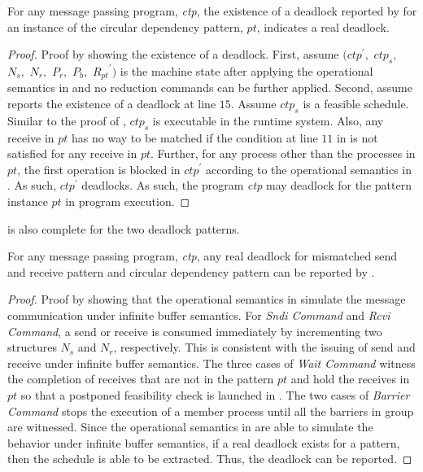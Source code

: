 \begin{lemma}
For any message passing program, \textit{ctp}, the existence of a deadlock reported by  for an instance of the circular dependency pattern, $\mathit{pt}$, indicates a real deadlock. 
\label{lemma:circular}
\end{lemma}
\begin{proof}
Proof by showing the existence of a deadlock. First, assume $(\mathit{ctp}^\prime,$ $\mathit{ctp}_s,$ $\mathit{N_s},$ $\mathit{N_r},$ $\mathit{P_r},$ $\mathit{P_b},$ $\mathit{R_{pt}}^\prime)$ is the machine state after applying the operational semantics in  and no reduction commands can be further applied. Second, assume  reports the existence of a deadlock at line $15$. Assume $\mathit{ctp}_s$ is a feasible schedule. Similar to the proof of , $\mathit{ctp}_s$ is executable in the runtime system. Also, any receive in $\mathit{pt}$ has no way to be matched if the condition at line $11$ in  is not satisfied for any receive in $\mathit{pt}$. Further, for any process other than the processes in $\mathit{pt}$, the first operation is blocked in $\mathit{ctp}^\prime$ according to the operational semantics in . As such, $\mathit{ctp}^\prime$ deadlocks. As such, the program \textit{ctp} may deadlock for the pattern instance $\mathit{pt}$ in program execution. 
\end{proof}

 is also complete for the two deadlock patterns. 

\begin{lemma}
For any message passing program, \textit{ctp}, any real deadlock for mismatched send and receive pattern and circular dependency pattern can be reported by .
\label{lemma:complete}
\end{lemma}
\begin{proof}
Proof by showing that the operational semantics in  simulate the message communication under infinite buffer semantics. For \emph{Sndi Command} and \emph{Rcvi Command}, a send or receive is consumed immediately by incrementing two structures $\mathit{N_s}$ and $\mathit{N_r}$, respectively. This is consistent with the issuing of send and receive under infinite buffer semantics. The three cases of \emph{Wait Command} witness the completion of receives that are not in the pattern $\mathit{pt}$ and hold the receives in $\mathit{pt}$ so that a postponed feasibility check is launched in . The two cases of \emph{Barrier Command} stops the execution of a member process until all the barriers in group are witnessed. Since the operational semantics in  are able to simulate the behavior under infinite buffer semantics, if a real deadlock exists for a pattern, then the schedule is able to be extracted. Thus, the deadlock can be reported.
\end{proof}

